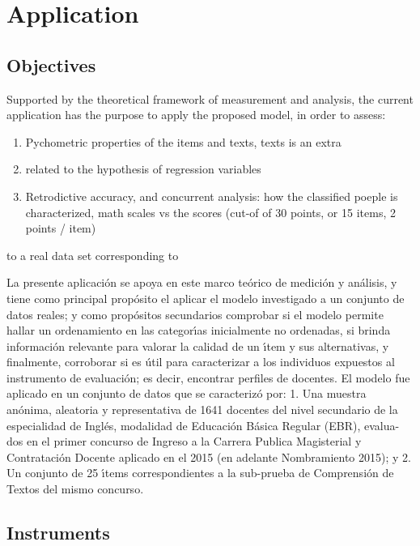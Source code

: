 \chapter{Application} \label{chap:application}

\section{Objectives}

Supported by the theoretical framework of measurement and analysis, the current application has the purpose to apply the proposed model, in order to assess:
\begin{enumerate}
	\item Pychometric properties of the items and texts, texts is an extra
	\item related to the hypothesis of regression variables
	\item Retrodictive accuracy, and concurrent analysis: how the classified poeple is characterized, math scales vs the scores (cut-of of 30 points, or 15 items, 2 points / item)
\end{enumerate}

to a real data set corresponding to 


La presente aplicación se apoya en este marco teórico de medición y análisis, y tiene
como principal propósito el aplicar el modelo investigado a un conjunto de datos reales; y
como propósitos secundarios comprobar si el modelo permite hallar un ordenamiento en las
categorı́as inicialmente no ordenadas, si brinda información relevante para valorar la calidad
de un ı́tem y sus alternativas, y finalmente, corroborar si es útil para caracterizar a los
individuos expuestos al instrumento de evaluación; es decir, encontrar perfiles de docentes.
El modelo fue aplicado en un conjunto de datos que se caracterizó por:
1. Una muestra anónima, aleatoria y representativa de 1641 docentes del nivel secundario
de la especialidad de Inglés, modalidad de Educación Básica Regular (EBR), evalua-
dos en el primer concurso de Ingreso a la Carrera Publica Magisterial y Contratación
Docente aplicado en el 2015 (en adelante Nombramiento 2015); y
2. Un conjunto de 25 ı́tems correspondientes a la sub-prueba de Comprensión de Textos
del mismo concurso.


\section{Instruments}


